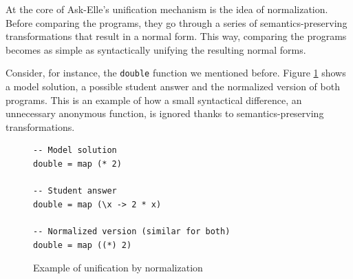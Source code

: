 At the core of Ask-Elle's unification mechanism is the idea of normalization. Before comparing the programs, they go through a series of semantics-preserving transformations that result in a normal form. This way, comparing the programs becomes as simple as syntactically unifying the resulting normal forms.

Consider, for instance, the \texttt{double} function we mentioned before. Figure \ref{fig:bg-unification-normalization} shows a model solution, a possible student answer and the normalized version of both programs. This is an example of how a small syntactical difference, an unnecessary anonymous function, is ignored thanks to semantics-preserving transformations.

\begin{figure}[H]
\begin{verbatim}
-- Model solution
double = map (* 2)

-- Student answer
double = map (\x -> 2 * x)

-- Normalized version (similar for both)
double = map ((*) 2)
\end{verbatim}
\caption{Example of unification by normalization}
\label{fig:bg-unification-normalization}
\end{figure}
